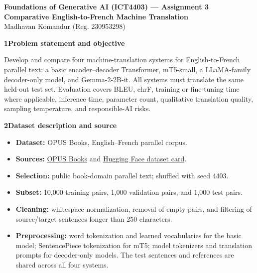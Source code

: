 \documentclass[10pt]{article}
\newcommand{\sectiontitle}[1]{\par\vspace{5pt}\textbf{\large #1}\vspace{2pt}\par}
\begin{document}
\begin{center}
{\Large \textbf{Foundations of Generative AI (ICT4403) --- Assignment 3}}\\
\textbf{Comparative English-to-French Machine Translation}\\
Madhavan Komandur (Reg. 230953298)
\end{center}

\sectiontitle{1\quad Problem statement and objective}
Develop and compare four machine-translation systems for English-to-French parallel text:
a basic encoder--decoder Transformer, mT5-small, a LLaMA-family decoder-only model, and
Gemma-2-2B-it. All systems must translate the same held-out test set. Evaluation covers
BLEU, chrF, training or fine-tuning time where applicable, inference time, parameter count,
qualitative translation quality, sampling temperature, and responsible-AI risks.

\sectiontitle{2\quad Dataset description and source}
\begin{itemize}
\item \textbf{Dataset:} OPUS Books, English--French parallel corpus.
\item \textbf{Sources:} \href{https://opus.nlpl.eu/legacy/opus-books.php}{OPUS Books}
and \href{https://huggingface.co/datasets/Helsinki-NLP/opus_books}{Hugging Face dataset card}.
\item \textbf{Selection:} public book-domain parallel text; shuffled with seed 4403.
\item \textbf{Subset:} 10,000 training pairs, 1,000 validation pairs, and 1,000 test pairs.
\item \textbf{Cleaning:} whitespace normalization, removal of empty pairs, and filtering
of source/target sentences longer than 250 characters.
\item \textbf{Preprocessing:} word tokenization and learned vocabularies for the basic model;
SentencePiece tokenization for mT5; model tokenizers and translation prompts for decoder-only
models. The test sentences and references are shared across all four systems.
\end{itemize}
\end{document}
